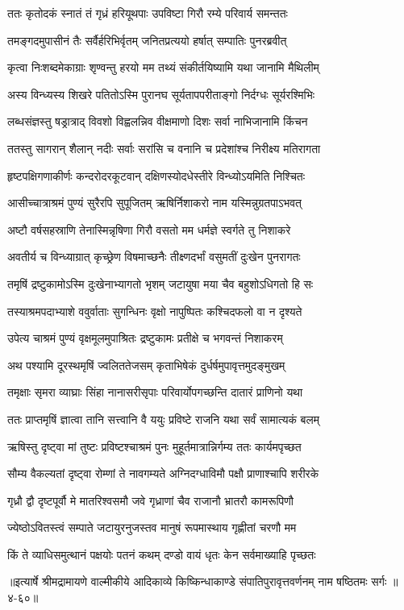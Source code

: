 
\twolineshloka
{ततः कृतोदकं स्नातं तं गृध्रं हरियूथपाः}
{उपविष्टा गिरौ रम्ये परिवार्य समन्ततः} %

\twolineshloka
{तमङ्गदमुपासीनं तैः सर्वैर्हरिभिर्वृतम्}
{जनितप्रत्ययो हर्षात् सम्पातिः पुनरब्रवीत्} %

\twolineshloka
{कृत्वा निःशब्दमेकाग्राः शृण्वन्तु हरयो मम}
{तथ्यं संकीर्तयिष्यामि यथा जानामि मैथिलीम्} %

\twolineshloka
{अस्य विन्ध्यस्य शिखरे पतितोऽस्मि पुरानघ}
{सूर्यतापपरीताङ्गो निर्दग्धः सूर्यरश्मिभिः} %

\twolineshloka
{लब्धसंज्ञस्तु षड्रात्राद् विवशो विह्वलन्निव}
{वीक्षमाणो दिशः सर्वा नाभिजानामि किंचन} %

\twolineshloka
{ततस्तु सागरान् शैलान् नदीः सर्वाः सरांसि च}
{वनानि च प्रदेशांश्च निरीक्ष्य मतिरागता} %

\twolineshloka
{हृष्टपक्षिगणाकीर्णः कन्दरोदरकूटवान्}
{दक्षिणस्योदधेस्तीरे विन्ध्योऽयमिति निश्चितः} %

\twolineshloka
{आसीच्चात्राश्रमं पुण्यं सुरैरपि सुपूजितम्}
{ऋषिर्निशाकरो नाम यस्मिन्नुग्रतपाऽभवत्} %

\twolineshloka
{अष्टौ वर्षसहस्राणि तेनास्मिन्नृषिणा गिरौ}
{वसतो मम धर्मज्ञे स्वर्गते तु निशाकरे} %

\twolineshloka
{अवतीर्य च विन्ध्याग्रात् कृच्छ्रेण विषमाच्छनैः}
{तीक्ष्णदर्भां वसुमतीं दुःखेन पुनरागतः} %

\twolineshloka
{तमृषिं द्रष्टुकामोऽस्मि दुःखेनाभ्यागतो भृशम्}
{जटायुषा मया चैव बहुशोऽधिगतो हि सः} %

\twolineshloka
{तस्याश्रमपदाभ्याशे ववुर्वाताः सुगन्धिनः}
{वृक्षो नापुष्पितः कश्चिदफलो वा न दृश्यते} %

\twolineshloka
{उपेत्य चाश्रमं पुण्यं वृक्षमूलमुपाश्रितः}
{द्रष्टुकामः प्रतीक्षे च भगवन्तं निशाकरम्} %

\twolineshloka
{अथ पश्यामि दूरस्थमृषिं ज्वलिततेजसम्}
{कृताभिषेकं दुर्धर्षमुपावृत्तमुदङ्मुखम्} %

\twolineshloka
{तमृक्षाः सृमरा व्याघ्राः सिंहा नानासरीसृपाः}
{परिवार्योपगच्छन्ति दातारं प्राणिनो यथा} %

\twolineshloka
{ततः प्राप्तमृषिं ज्ञात्वा तानि सत्त्वानि वै ययुः}
{प्रविष्टे राजनि यथा सर्वं सामात्यकं बलम्} %

\twolineshloka
{ऋषिस्तु दृष्ट्वा मां तुष्टः प्रविष्टश्चाश्रमं पुनः}
{मुहूर्तमात्रान्निर्गम्य ततः कार्यमपृच्छत} %

\twolineshloka
{सौम्य वैकल्यतां दृष्ट्वा रोम्णां ते नावगम्यते}
{अग्निदग्धाविमौ पक्षौ प्राणाश्चापि शरीरके} %

\twolineshloka
{गृध्रौ द्वौ दृष्टपूर्वौ मे मातरिश्वसमौ जवे}
{गृध्राणां चैव राजानौ भ्रातरौ कामरूपिणौ} %

\twolineshloka
{ज्येष्ठोऽवितस्त्वं सम्पाते जटायुरनुजस्तव}
{मानुषं रूपमास्थाय गृह्णीतां चरणौ मम} %

\twolineshloka
{किं ते व्याधिसमुत्थानं पक्षयोः पतनं कथम्}
{दण्डो वायं धृतः केन सर्वमाख्याहि पृच्छतः} %


॥इत्यार्षे श्रीमद्रामायणे वाल्मीकीये आदिकाव्ये किष्किन्धाकाण्डे संपातिपुरावृत्तवर्णनम् नाम षष्ठितमः सर्गः ॥४-६०॥
